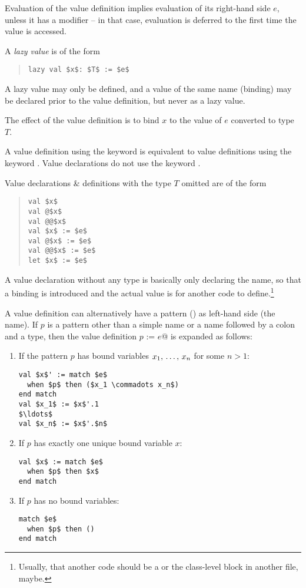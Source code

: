 Evaluation of the value definition implies evaluation of its right-hand side $e$, unless it has a modifier  -- in that case, evaluation is deferred to the first time the value is accessed. 

A {\em lazy value} is of the form
\begin{quote}\begin{lstlisting}
lazy val $x$: $T$ := $e$
\end{lstlisting}\end{quote}

A lazy value may only be defined, and a value of the same name (binding) may be declared prior to the value definition, but never as a lazy value. 

The effect of the value definition is to bind $x$ to the value of $e$ converted to type $T$. 

A value definition using the keyword  is equivalent to value definitions using the keyword . Value declarations do not use the keyword . 

Value declarations \& definitions with the type $T$ omitted are of the form
\begin{quote}\begin{lstlisting}
val $x$
val @$x$
val @@$x$
val $x$ := $e$
val @$x$ := $e$
val @@$x$ := $e$
let $x$ := $e$
\end{lstlisting}\end{quote}

A value declaration without any type is basically only declaring the name, so that a binding is introduced and the actual value is for another code to define.\footnote{Usually, that another code should be a  or the class-level block in another file, maybe.}

A value definition can alternatively have a pattern () as left-hand side (the name). If $p$ is a pattern other than a simple name or a name followed by a colon and a type, then the value definition \lstinline@val $p$ := $e$@ is expanded as follows: 

\begin{enumerate}
\item
If the pattern $p$ has bound variables $x_1 ,\, \ldots ,\, x_n$ for some $n > 1$:
\begin{lstlisting}[escapechar=@]
val $x$' := match $e$
  when $p$ then ($x_1 \commadots x_n$)
end match
val $x_1$ := $x$'.1
$\ldots$
val $x_n$ := $x$'.$n$
\end{lstlisting}

\item
If $p$ has exactly one unique bound variable $x$:
\begin{lstlisting}
val $x$ := match $e$
  when $p$ then $x$
end match
\end{lstlisting}

\item
If $p$ has no bound variables:
\begin{lstlisting}
match $e$
  when $p$ then ()
end match
\end{lstlisting}
\end{enumerate}

